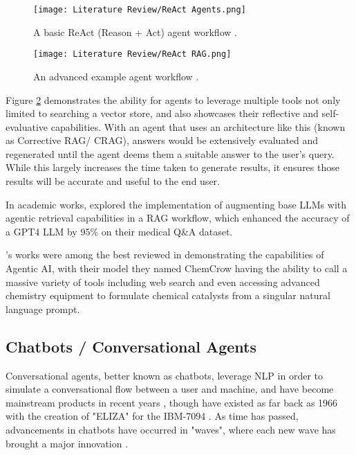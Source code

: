 \begin{figure}[H] 
    \centering
    \texttt{[image: Literature Review/ReAct Agents.png]}
    \caption{A basic ReAct (Reason + Act) agent workflow \autocite{weaviateWhatAgenticRAG2024}.}
    \label{fig:ReActAgents}
\end{figure}

\begin{figure}[H] 
    \centering
    \texttt{[image: Literature Review/ReAct RAG.png]}
    \caption{An advanced example agent workflow \autocite{weaviateWhatAgenticRAG2024}.}
    \label{fig:ReActRAG}
\end{figure}

Figure \ref{fig:ReActRAG} demonstrates the ability for agents to leverage multiple tools not only limited to searching a vector store,
and also showcases their reflective and self-evaluative capabilities. With an agent that uses an architecture like this (known as Corrective RAG/
CRAG), answers would be extensively evaluated and regenerated until the agent deems them a suitable answer to the user's query. While this largely increases the time taken to generate results, it ensures those results will be accurate and useful to the end user. 

In academic works, \textcite{wooCustomLargeLanguage2025} explored the implementation of augmenting base LLMs with agentic retrieval 
capabilities in a RAG workflow, which enhanced the accuracy of a GPT4 LLM by 95\% on their medical Q\&A dataset.

\textcite{m.branAugmentingLargeLanguage2024}'s works were among the best reviewed in demonstrating the capabilities of 
Agentic AI, with their model they named ChemCrow having the ability to call a massive variety of tools including web search 
and even accessing advanced chemistry equipment to formulate chemical catalysts from a singular natural language prompt.

\subsection{Chatbots / Conversational Agents}

Conversational agents, better known as chatbots, leverage NLP in order to simulate a conversational flow 
between a user and machine, and have become mainstream products in recent years \autocite{liao_all_2018},
though have existed as far back as 1966 with the creation of "ELIZA" for the IBM-7094 \autocite{weizenbaum_elizacomputer_1966}.
As time has passed, advancements in chatbots have occurred in "waves", where each new wave has brought a major innovation \autocite{schobel_charting_2024}.

